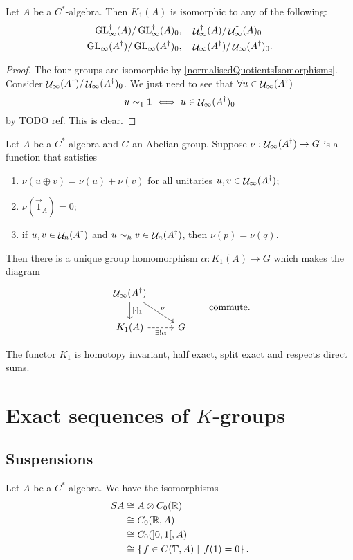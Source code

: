 \begin{proposition}
Let $A$ be a $C^*$-algebra. Then $K_1(A)$ is isomorphic to any of the following:
\begin{align*}
\operatorname{GL}_\infty^\dagger(A) / \operatorname{GL}_\infty^\dagger(A)_0,& & &\mathop{\mathcal{U}}\nolimits_\infty^\dagger(A) / \mathop{\mathcal{U}}\nolimits_\infty^\dagger(A)_0 \\
\operatorname{GL}_\infty(A^\dagger) / \operatorname{GL}_\infty(A^\dagger)_0,& & &\mathop{\mathcal{U}}\nolimits_\infty(A^\dagger) / \mathop{\mathcal{U}}\nolimits_\infty(A^\dagger)_0.
\end{align*}
\end{proposition}
\begin{proof}
The four groups are isomorphic by \ref{normalisedQuotientsIsomorphisms}. Consider $\mathop{\mathcal{U}}\nolimits_\infty(A^\dagger) / \mathop{\mathcal{U}}\nolimits_\infty(A^\dagger)_0$. We just need to see that $\forall u\in \mathop{\mathcal{U}}\nolimits_\infty(A^\dagger)$
\[ u\sim_1 \boldsymbol{\mathrm{1}} \iff u \in \mathop{\mathcal{U}}\nolimits_\infty(A^\dagger)_0\]
by TODO ref. This is clear.
\end{proof}

\begin{proposition} \label{univeralPropertyK1}
Let $A$ be a $C^*$-algebra and $G$ an Abelian group. Suppose $\nu:\mathop{\mathcal{U}}\nolimits_\infty(A^\dagger)\to G$ is a function that satisfies
\begin{enumerate}
\item $\nu(u\oplus v) = \nu(u)+\nu(v)$ for all unitaries $u,v\in\mathop{\mathcal{U}}\nolimits_\infty(A^\dagger)$;
\item $\nu(\vec{1}_A) = 0$;
\item if $u,v\in\mathop{\mathcal{U}}\nolimits_n(A^\dagger)$ and $u\sim_h v \in \mathop{\mathcal{U}}\nolimits_n(A^\dagger)$, then $\nu(p) = \nu(q)$.
\end{enumerate}
Then there is a unique group homomorphism $\alpha: K_{1}(A) \to G$ which makes the diagram
\[ \begin{tikzcd}
\Unitaries_\infty(A^\dagger) \ar[d,"{[\cdot]_1}"] \ar[dr, "\nu"] & \\
K_{1}(A) \ar[r, dashed, swap, "\exists! \alpha"] & G
\end{tikzcd} \qquad \text{commute.}\]
\end{proposition}

The functor $K_1$ is homotopy invariant, half exact, split exact and respects direct sums.

\section{Exact sequences of $K$-groups}
\subsection{Suspensions}
\begin{lemma}
Let $A$ be a $C^*$-algebra. We have the isomorphisms
\begin{align*}
SA &\cong A\otimes C_0(\mathbb{R}) \\ &\cong C_0(\mathbb{R}, A) \\ &\cong C_0(]0,1[, A) \\ &\cong \left\{\left. f\in C(\mathbb{T}, A) \;\right|\; f(1)=0 \right\}.
\end{align*}
\end{lemma}

